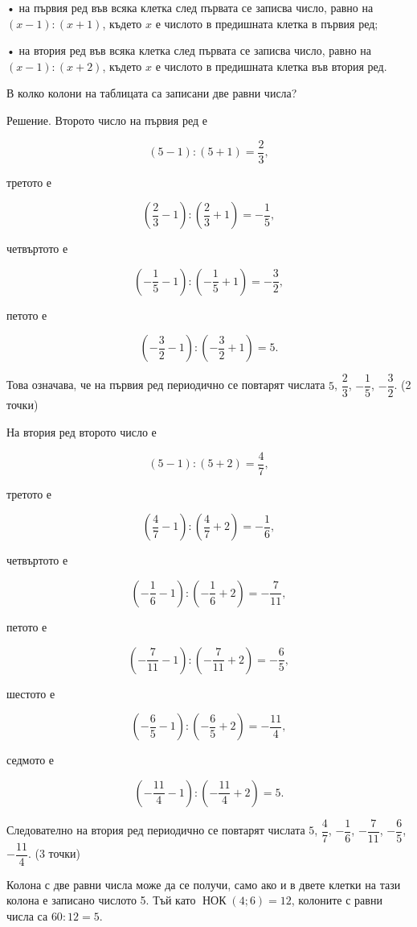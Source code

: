 • на първия ред във всяка клетка след първата се записва число, равно на $(x-1):(x+1)$, където $x$ е числото в предишната клетка в първия ред;

• на втория ред във всяка клетка след първата се записва число, равно на $(x-1):(x+2)$, където $x$ е числото в предишната клетка във втория ред.

В колко колони на таблицата са записани две равни числа?

Решение. Второто число на първия ред е

$$(5-1):(5+1)=\dfrac{2}{3},$$

третото е

$$\left(\dfrac{2}{3}-1\right):\left(\dfrac{2}{3}+1\right)=-\dfrac{1}{5},$$

четвъртото е

$$\left(-\dfrac{1}{5}-1\right):\left(-\dfrac{1}{5}+1\right)=-\dfrac{3}{2},$$

петото е

$$\left(-\dfrac{3}{2}-1\right):\left(-\dfrac{3}{2}+1\right)=5.$$

Това означава, че на първия ред периодично се повтарят числата $5$, $\dfrac{2}{3}$, $-\dfrac{1}{5}$, $-\dfrac{3}{2}$. (2 точки)

На втория ред второто число е

$$(5-1):(5+2)=\dfrac{4}{7},$$

третото е

$$\left(\dfrac{4}{7}-1\right):\left(\dfrac{4}{7}+2\right)=-\dfrac{1}{6},$$

четвъртото е

$$\left(-\dfrac{1}{6}-1\right):\left(-\dfrac{1}{6}+2\right)=-\dfrac{7}{11},$$

петото е

$$\left(-\dfrac{7}{11}-1\right):\left(-\dfrac{7}{11}+2\right)=-\dfrac{6}{5},$$

шестото е

$$\left(-\dfrac{6}{5}-1\right):\left(-\dfrac{6}{5}+2\right)=-\dfrac{11}{4},$$

седмото е

$$\left(-\dfrac{11}{4}-1\right):\left(-\dfrac{11}{4}+2\right)=5.$$

Следователно на втория ред периодично се повтарят числата $5$, $\dfrac{4}{7}$, $-\dfrac{1}{6}$, $-\dfrac{7}{11}$, $-\dfrac{6}{5}$, $-\dfrac{11}{4}$. (3 точки)

Колона с две равни числа може да се получи, само ако и в двете клетки на тази колона е записано числото 5. Тъй като $\operatorname{НОК}(4;6)=12$, колоните с равни числа са $60:12=5$.

